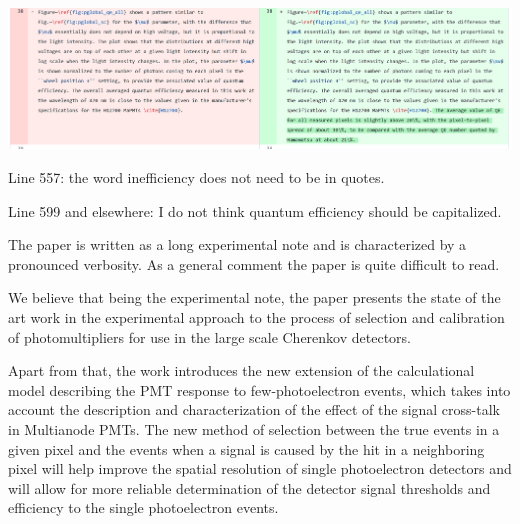 \documentclass[11pt]{report}
\begin{document}

\includegraphics[width=\linewidth]{round1/1.12.png}

\begin{tcolorbox}[enlarge top by=2em,colbacktitle=black!60!white,colframe=black!80!white,left=0pt,right=0pt,top=0pt,bottom=0pt,boxrule=0.3pt,title=\bfseries1.13 and 1.14]
Line 557:  the word inefficiency does not need to be in quotes.

Line 599 and elsewhere:  I do not think quantum efficiency should be capitalized.
\end{tcolorbox}








\clearpage






\begin{tcolorbox}[enlarge top by=2em,colbacktitle=blue!60!white,colframe=black!80!white,left=0pt,right=0pt,top=0pt,bottom=0pt,boxrule=0.3pt,title=\bfseries2.01]
The paper is written as a long experimental note and is characterized by a pronounced verbosity. As a general comment the paper is quite difficult to read.
\end{tcolorbox}

We believe that being the experimental note, the paper presents the state of the art work in the experimental approach to the process of selection and calibration of photomultipliers for use in the large scale Cherenkov detectors. 

Apart from that, the work introduces the new extension of the calculational model describing the PMT response to few-photoelectron events, which takes into account the description and characterization of the effect of the signal cross-talk in Multianode PMTs.
The new method of selection between the true events in a given pixel and the events when a signal is caused by the hit in a neighboring pixel will help improve the spatial resolution of single photoelectron detectors and will allow for more reliable determination of the detector signal thresholds and efficiency to the single photoelectron events.
\end{document}
